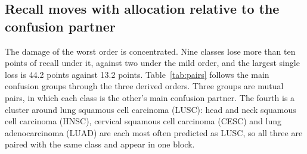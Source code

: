 \subsection{Recall moves with allocation relative to the confusion partner}
\label{sec:recall}
The damage of the worst order is concentrated. Nine classes lose more than ten points of recall under it, against two under the mild order, and the largest single loss is 44.2 points against 13.2 points. Table~\ref{tab:pairs} follows the main confusion groups through the three derived orders. Three groups are mutual pairs, in which each class is the other's main confusion partner. The fourth is a cluster around lung squamous cell carcinoma (LUSC): head and neck squamous cell carcinoma (HNSC), cervical squamous cell carcinoma (CESC) and lung adenocarcinoma (LUAD) are each most often predicted as LUSC, so all three are paired with the same class and appear in one block.


